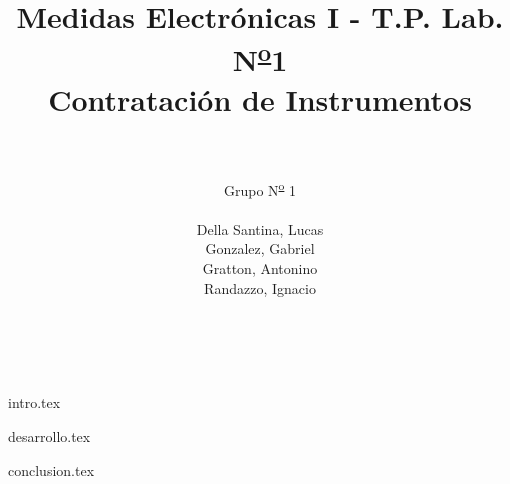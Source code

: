 

\title{ Medidas Electrónicas I - T.P. Lab. N\textsuperscript{\underline{o}}1\\
        Contratación de Instrumentos
      }
\author{
        \\~\\
        Grupo N\textsuperscript{\underline{o}} 1 
        \\~\\
        Della Santina, Lucas \\
        Gonzalez, Gabriel \\
        Gratton, Antonino \\
        Randazzo, Ignacio\\
        \\~\\
        }


\maketitle
\tableofcontents

{intro.tex}

{desarrollo.tex}

{conclusion.tex}


